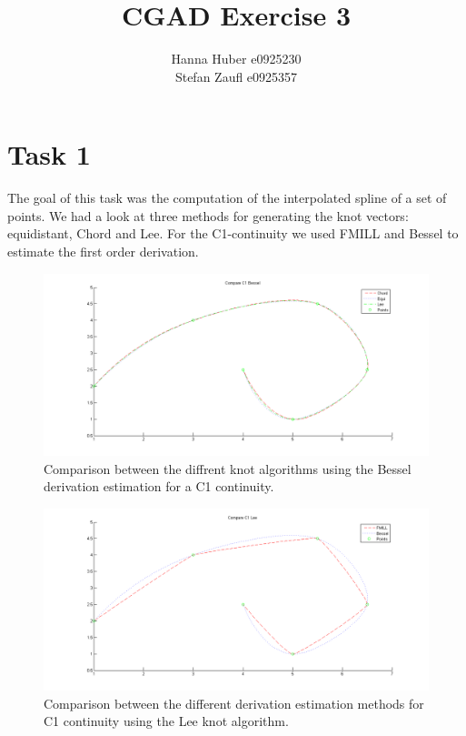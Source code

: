 \documentclass[12pt,a4paper]{article}
\title{CGAD Exercise 3}
\author{Hanna Huber e0925230\\Stefan Zaufl e0925357}
\begin{document}
\maketitle
\section{Task 1}
The goal of this task was the computation of the interpolated spline of a set of points. We had a look at three methods for generating the knot vectors: equidistant, Chord and Lee. For the C1-continuity we used FMILL and Bessel to estimate the first order derivation.

\begin{figure}[hbtp]
\centering
\includegraphics[width=\textwidth]{compC1Bessel.png}
\caption{Comparison between the diffrent knot algorithms using the Bessel derivation estimation for a C1 continuity.}
\end{figure}

\begin{figure}[hbtp]
\centering
\includegraphics[width=\textwidth]{compC1Lee.png} 
\caption{Comparison between the different derivation estimation methods for C1 continuity using the Lee knot algorithm.}
\end{figure}
\end{document}
